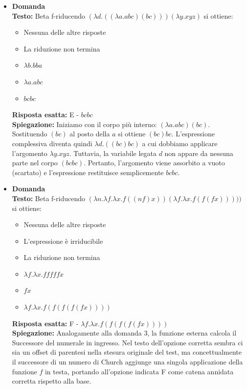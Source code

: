\documentclass[12pt, a4paper]{article}
\newcounter{domandateoria}
\begin{document}
\begin{itemize}
    \item {}\textbf{Domanda \thedomandateoria} \\
    \textbf{Testo:} Beta f-riducendo $(\lambda d.((\lambda a.a b c)(b c)))(\lambda y.x y z)$ si ottiene:
    \begin{itemize}
        \item[A)] Nessuna delle altre risposte
        \item[B)] La riduzione non termina
        \item[C)] $\lambda b.b b a$
        \item[D)] $\lambda a.a b c$
        \item[E)] $b c b c$
    \end{itemize}
    \textbf{Risposta esatta:} E - $b c b c$ \\
    \textbf{Spiegazione:} Iniziamo con il corpo più interno: $(\lambda a.a b c)(b c)$. Sostituendo $(b c)$ al posto della $a$ si ottiene $(b c) b c$. L'espressione complessiva diventa quindi $\lambda d.((b c) b c)$ a cui dobbiamo applicare l'argomento $\lambda y.x y z$. Tuttavia, la variabile legata $d$ non appare da nessuna parte nel corpo $(b c b c)$. Pertanto, l'argomento viene assorbito a vuoto (scartato) e l'espressione restituisce semplicemente $b c b c$.
    \vspace{0.3cm}

    \item {}\textbf{Domanda \thedomandateoria} \\
    \textbf{Testo:} Beta f-riducendo $(\lambda n.\lambda f.\lambda x.f((n f)x))(\lambda f.\lambda x.f(f(f x)))))$ si ottiene:
    \begin{itemize}
        \item[A)] Nessuna delle altre risposte
        \item[B)] L'espressione è irriducibile
        \item[C)] La riduzione non termina
        \item[D)] $\lambda f.\lambda x.f f f f f x$
        \item[E)] $f x$
        \item[F)] $\lambda f.\lambda x.f(f(f(f(f x))))$
    \end{itemize}

\newpage
    
    \textbf{Risposta esatta:} F - $\lambda f.\lambda x.f(f(f(f(f x))))$ \\
    \textbf{Spiegazione:} Analogamente alla domanda 3, la funzione esterna calcola il Successore del numerale in ingresso. Nel testo dell'opzione corretta sembra ci sia un offset di parentesi nella stesura originale del test, ma concettualmente il successore di un numero di Church aggiunge una singola applicazione della funzione $f$ in testa, portando all'opzione indicata F come catena annidata corretta rispetto alla base.
    \vspace{0.3cm}
\end{itemize}
\end{document}

